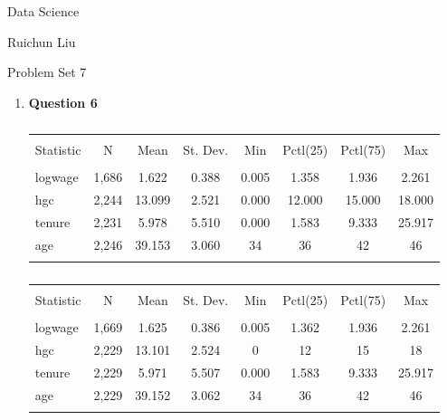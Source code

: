 \documentclass[11pt,a4paper]{article}
\begin{document}
	\begin{center}
		Data Science
		
		Ruichun Liu
		
		Problem Set 7
	\end{center}
\begin{enumerate}



    \item \textbf{Question 6}
		  \begin{description}
\begin{table}[!htbp] \centering 
  \caption{} 
  \label{} 
\begin{tabular}{@{\extracolsep{5pt}}lccccccc} 
\\[-1.8ex]\hline 
\hline \\[-1.8ex] 
Statistic & \multicolumn{1}{c}{N} & \multicolumn{1}{c}{Mean} & \multicolumn{1}{c}{St. Dev.} & \multicolumn{1}{c}{Min} & \multicolumn{1}{c}{Pctl(25)} & \multicolumn{1}{c}{Pctl(75)} & \multicolumn{1}{c}{Max} \\ 
\hline \\[-1.8ex] 
logwage & 1,686 & 1.622 & 0.388 & 0.005 & 1.358 & 1.936 & 2.261 \\ 
hgc & 2,244 & 13.099 & 2.521 & 0.000 & 12.000 & 15.000 & 18.000 \\ 
tenure & 2,231 & 5.978 & 5.510 & 0.000 & 1.583 & 9.333 & 25.917 \\ 
age & 2,246 & 39.153 & 3.060 & 34 & 36 & 42 & 46 \\ 
\hline \\[-1.8ex] 
\end{tabular} 
\end{table}

\begin{table}[!htbp] \centering 
  \caption{} 
  \label{} 
\begin{tabular}{@{\extracolsep{5pt}}lccccccc} 
\\[-1.8ex]\hline 
\hline \\[-1.8ex] 
Statistic & \multicolumn{1}{c}{N} & \multicolumn{1}{c}{Mean} & \multicolumn{1}{c}{St. Dev.} & \multicolumn{1}{c}{Min} & \multicolumn{1}{c}{Pctl(25)} & \multicolumn{1}{c}{Pctl(75)} & \multicolumn{1}{c}{Max} \\ 
\hline \\[-1.8ex] 
logwage & 1,669 & 1.625 & 0.386 & 0.005 & 1.362 & 1.936 & 2.261 \\ 
hgc & 2,229 & 13.101 & 2.524 & 0 & 12 & 15 & 18 \\ 
tenure & 2,229 & 5.971 & 5.507 & 0.000 & 1.583 & 9.333 & 25.917 \\ 
age & 2,229 & 39.152 & 3.062 & 34 & 36 & 42 & 46 \\ 
\hline \\[-1.8ex] 
\end{tabular} 
\end{table}


\end{description}
\end{enumerate}
\end{document}
